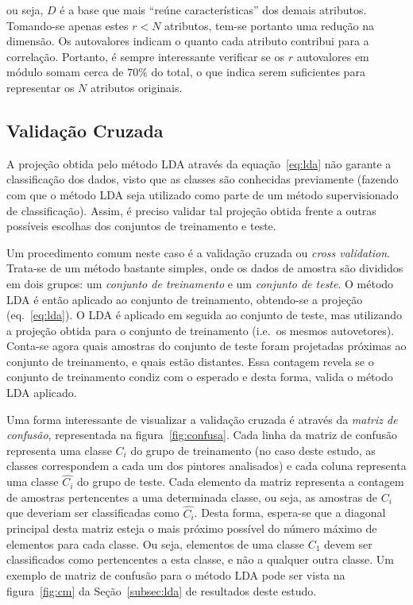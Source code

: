 \noindent ou seja, $D$ é a base que mais ``reúne características'' dos demais
atributos. Tomando-se apenas estes $r < N$ atributos, tem-se portanto uma
redução na dimensão. Os autovalores indicam o quanto cada
atributo contribui para a correlação. Portanto, é sempre interessante verificar se
os $r$ autovalores em módulo somam cerca de $70\%$ do total, o que indica
serem suficientes para representar os $N$ atributos originais.~\cite{luciano}

\subsection{Validação Cruzada}

A projeção obtida pelo método LDA através da equação~\ref{eq:lda} não
garante a classificação dos dados, visto que as classes são conhecidas
previamente (fazendo com que o método LDA seja utilizado como parte de
um método supervisionado de classificação). Assim, é preciso validar
tal projeção obtida frente a outras possíveis escolhas dos conjuntos
de treinamento e teste.

Um procedimento comum neste caso é a validação cruzada ou
\textit{cross validation}. Trata-se de um método bastante simples,
onde os dados de amostra são divididos em dois grupos: um
\emph{conjunto de treinamento} e um \emph{conjunto de teste}. O método
LDA é então aplicado ao conjunto de treinamento, obtendo-se a projeção
(eq.~\ref{eq:lda}). O LDA é aplicado em seguida ao conjunto de teste,
mas utilizando a projeção obtida para o conjunto de treinamento
(i.e.\ os mesmos autovetores). Conta-se agora quais amostras do
conjunto de teste foram projetadas próximas ao conjunto de
treinamento, e quais estão distantes. Essa contagem revela se o
conjunto de treinamento condiz com o esperado e desta forma, valida o
método LDA aplicado.

Uma forma interessante de visualizar a validação cruzada é através da
\emph{matriz de confusão}, representada na
figura~\ref{fig:confusa}. Cada linha da matriz de confusão representa
uma classe $C_i$ do grupo de treinamento (no caso deste estudo, as
classes correspondem a cada um dos pintores analisados) e cada coluna
representa uma classe $\hat{C_i}$ do grupo de teste. Cada elemento da
matriz representa a contagem de amostras pertencentes a uma
determinada classe, ou seja, as amostras de $C_i$ que deveriam ser
classificadas como $\hat{C_i}$. Desta forma, espera-se que a diagonal
principal desta matriz esteja o mais próximo possível do número máximo
de elementos para cada classe. Ou seja, elementos de uma classe $C_1$
devem ser classificados como pertencentes a esta classe, e não a
qualquer outra classe. Um exemplo de matriz de confusão para o método
LDA pode ser vista na figura~\ref{fig:cm} da Seção~\ref{subsec:lda} de
resultados deste estudo.

